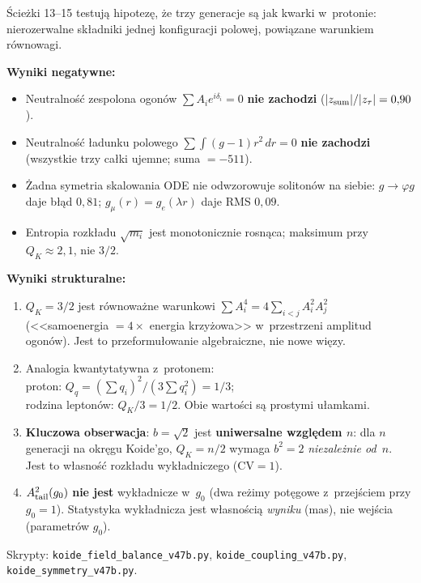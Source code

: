 \begin{remark}%
\label{rem:T-field-balance}
\'Scie\.zki 13--15 testuj\k{a} hipotez\k{e}, \.ze trzy generacje
s\k{a} jak kwarki w~protonie: nierozerwalne sk\l{}adniki jednej
konfiguracji polowej, powi\k{a}zane warunkiem r\'ownowagi.

\medskip\noindent
\textbf{Wyniki negatywne:}
\begin{itemize}[nosep]
  \item Neutralno\'s\'c zespolona ogon\'ow
    $\sum A_i e^{i\delta_i} = 0$ \textbf{nie zachodzi}
    ($|z_{\rm sum}|/|z_\tau| = 0{,}90$).
  \item Neutralno\'s\'c \l{}adunku polowego
    $\sum \!\int\!(g{-}1)r^2\,dr = 0$ \textbf{nie zachodzi}
    (wszystkie trzy ca\l{}ki ujemne; suma $= -511$).
  \item \.Zadna symetria skalowania ODE nie odwzorowuje
    soliton\'ow na siebie: $g \to \varphi g$ daje b\l{}\k{a}d $0{,}81$;
    $g_\mu(r) = g_e(\lambda r)$ daje RMS $0{,}09$.
  \item Entropia rozk\l{}adu $\sqrt{m_i}$ jest monotonicznie rosn\k{a}ca;
    maksimum przy $Q_K \approx 2{,}1$, nie $3/2$.
\end{itemize}

\medskip\noindent
\textbf{Wyniki strukturalne:}
\begin{enumerate}[nosep]
  \item $Q_K = 3/2$ jest r\'ownowa\.zne warunkowi
    $\sum A_i^4 = 4\sum_{i<j} A_i^2 A_j^2$
    (<<samoenergia $= 4 \times$ energia krzy\.zowa>>
    w~przestrzeni amplitud ogon\'ow).
    Jest to przeformu\l{}owanie algebraiczne, nie nowe wi\k{e}zy.
  \item Analogia kwantytatywna z~protonem:\\
    proton: $Q_q = (\sum q_i)^2 / (3\sum q_i^2) = 1/3$;\\
    rodzina lepton\'ow: $Q_K/3 = 1/2$.
    Obie warto\'sci s\k{a} prostymi u\l{}amkami.
  \item \textbf{Kluczowa obserwacja}:
    $b = \sqrt{2}$ jest \textbf{uniwersalne wzgl\k{e}dem $n$}:
    dla $n$ generacji na okr\k{e}gu Koide'go,
    $Q_K = n/2$ wymaga $b^2 = 2$ \emph{niezale\.znie od~$n$}.
    Jest to w\l{}asno\'s\'c rozk\l{}adu wyk\l{}adniczego
    ($\mathrm{CV} = 1$).
  \item $A_{\rm tail}^2(g_0)$ \textbf{nie jest} wyk\l{}adnicze w~$g_0$
    (dwa re\.zimy pot\k{e}gowe z~przej\'sciem przy $g_0 = 1$).
    Statystyka wyk\l{}adnicza jest w\l{}asno\'sci\k{a} \emph{wyniku}
    (mas), nie wej\'scia (parametr\'ow $g_0$).
\end{enumerate}
Skrypty: \texttt{koide\_field\_balance\_v47b.py},
\texttt{koide\_coupling\_v47b.py},
\texttt{koide\_symmetry\_v47b.py}.
\end{remark}

